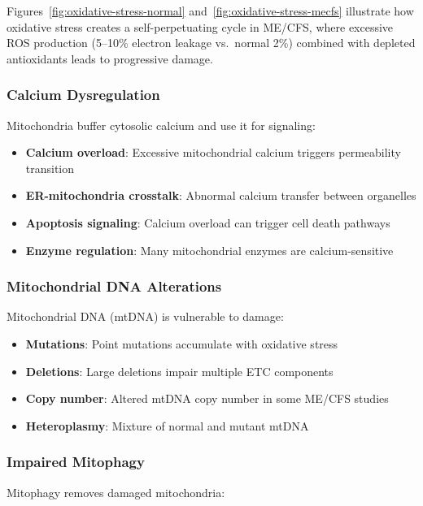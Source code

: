 Figures~\ref{fig:oxidative-stress-normal} and~\ref{fig:oxidative-stress-mecfs} illustrate how oxidative stress creates a self-perpetuating cycle in ME/CFS, where excessive ROS production (5--10\% electron leakage vs.\ normal 2\%) combined with depleted antioxidants leads to progressive damage.

\subsubsection{Calcium Dysregulation}

Mitochondria buffer cytosolic calcium and use it for signaling:

\begin{itemize}
    \item \textbf{Calcium overload}: Excessive mitochondrial calcium triggers permeability transition
    \item \textbf{ER-mitochondria crosstalk}: Abnormal calcium transfer between organelles
    \item \textbf{Apoptosis signaling}: Calcium overload can trigger cell death pathways
    \item \textbf{Enzyme regulation}: Many mitochondrial enzymes are calcium-sensitive
\end{itemize}

\subsubsection{Mitochondrial DNA Alterations}

Mitochondrial DNA (mtDNA) is vulnerable to damage:

\begin{itemize}
    \item \textbf{Mutations}: Point mutations accumulate with oxidative stress
    \item \textbf{Deletions}: Large deletions impair multiple ETC components
    \item \textbf{Copy number}: Altered mtDNA copy number in some ME/CFS studies
    \item \textbf{Heteroplasmy}: Mixture of normal and mutant mtDNA
\end{itemize}

\subsubsection{Impaired Mitophagy}

Mitophagy removes damaged mitochondria:

